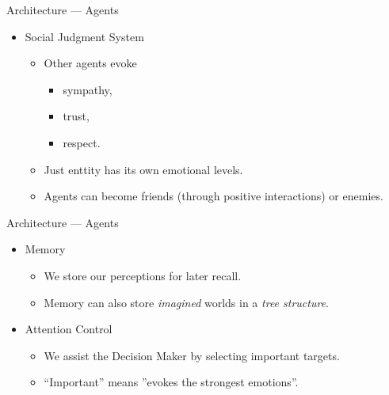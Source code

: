 \documentclass{beamer}
\def\tikzoverlay{%
   \tikz[baseline,overlay]\node[every overlay node]
}%
\begin{document}
   \begin{frame}{Architecture --- Agents}
      \begin{itemize}
         \item {Social Judgment System}
            \begin{itemize}
               \item Other agents evoke
                  \begin{itemize}
                     \item sympathy,
                     \item trust,
                     \item respect.
                  \end{itemize}
               \pause
               \item Just enttity has its own emotional levels.
               \item Agents can become friends (through positive interactions) or enemies.
            \end{itemize}
      \end{itemize}
      
   \end{frame}
   
   \begin{frame}{Architecture --- Agents}
      \begin{itemize}
         \item Memory
         \begin{itemize}
            \item We store our perceptions for later recall.
            \item Memory can also store \emph{imagined} worlds in a \emph{tree structure}.
         \end{itemize}
         \pause
         \item Attention Control
         \begin{itemize}
            \item We assist the Decision Maker by selecting important targets.
            \item ``Important'' means ''evokes the strongest emotions''.
         \end{itemize}
      \end{itemize}
      
   \end{frame}
   
\end{document}
